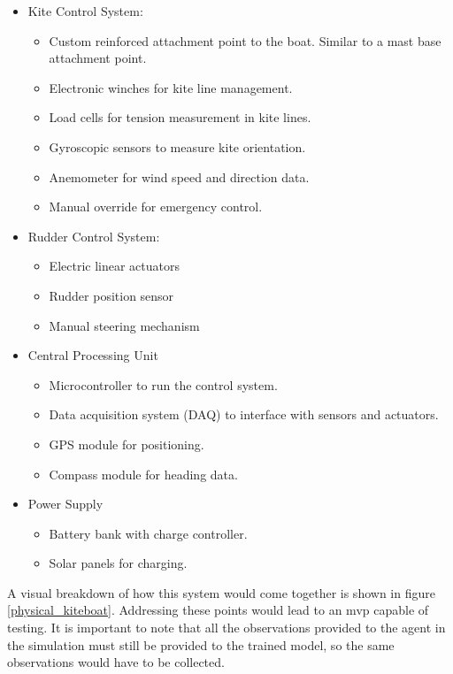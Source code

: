 \begin{itemize}
    \item Kite Control System:
    \begin{itemize}
        \item Custom reinforced attachment point to the boat. Similar to a mast base attachment point.
        \item Electronic winches for kite line management.
        \item Load cells for tension measurement in kite lines.
        \item Gyroscopic sensors to measure kite orientation.
        \item Anemometer for wind speed and direction data.
        \item Manual override for emergency control.
    \end{itemize}
    \item Rudder Control System:
    \begin{itemize}
        \item Electric linear actuators
        \item Rudder position sensor
        \item Manual steering mechanism
    \end{itemize}
    \item Central Processing Unit
    \begin{itemize}
        \item Microcontroller to run the control system.
        \item Data acquisition system (DAQ) to interface with sensors and actuators.
        \item GPS module for positioning.
        \item Compass module for heading data.
    \end{itemize}
    \item Power Supply
    \begin{itemize}
        \item Battery bank with charge controller.
        \item Solar panels for charging.
    \end{itemize}
\end{itemize}

A visual breakdown of how this system would come together is shown in figure$~$\ref{physical_kiteboat}. Addressing these points would lead to an mvp capable of testing. It is important to note that all the observations provided to the agent in the simulation must still be provided to the trained model, so the same observations would have to be collected.

